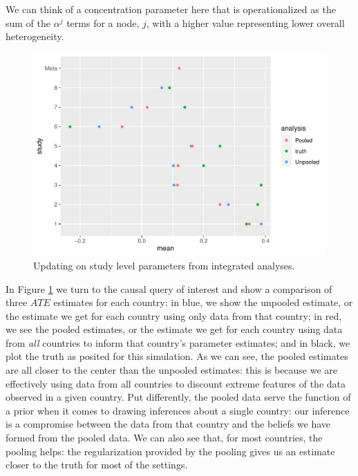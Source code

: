 \documentclass[
  12pt,
]{book}
\begin{document}
We can think of a concentration parameter here that is operationalized as the sum of the \(\alpha^j\) terms for a node, \(j\), with a higher value representing lower overall heterogeneity.

\begin{figure}

{\centering \includegraphics{ii_files/figure-latex/metaplot-1} 

}

\caption{Updating on study level parameters from integrated analyses. }\label{fig:metaplot}
\end{figure}

In Figure \ref{fig:metaplot} we turn to the causal query of interest and show a comparison of three \(ATE\) estimates for each country: in blue, we show the unpooled estimate, or the estimate we get for each country using only data from that country; in red, we see the pooled estimates, or the estimate we get for each country using data from \emph{all} countries to inform that country's parameter estimates; and in black, we plot the truth as posited for this simulation. As we can see, the pooled estimates are all closer to the center than the unpooled estimates: this is because we are effectively using data from all countries to discount extreme features of the data observed in a given country. Put differently, the pooled data serve the function of a prior when it comes to drawing inferences about a single country: our inference is a compromise between the data from that country and the beliefs we have formed from the pooled data. We can also see that, for most countries, the pooling helps: the regularization provided by the pooling gives us an estimate closer to the truth for most of the settings.
\end{document}
